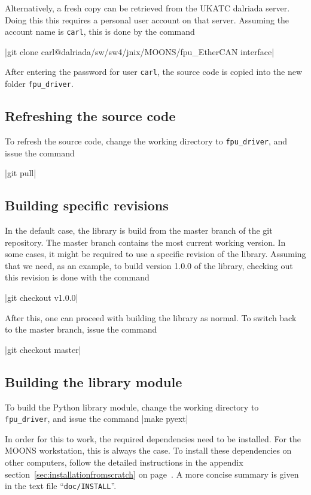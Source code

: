 \documentclass[11pt,a4paper]{report}
\begin{document}
Alternatively, a fresh copy can be retrieved from the UKATC dalriada
server. Doing this this requires a personal user account on that
server. Assuming the account name is \texttt{carl}, this is done by
the command

|git clone carl@dalriada/sw/sw4/jnix/MOONS/fpu_EtherCAN interface|

After entering the password for user \texttt{carl}, the
source code is copied into the new folder \texttt{fpu\_driver}.

\subsection{Refreshing the source code}
To refresh the source code, change the
working directory to \texttt{fpu\_driver},
and issue the command

|git pull|


\subsection{Building specific revisions}
In the default case, the library is build from
the master branch of the git repository.
The master branch contains the most current
working version.
In some cases, it might be required to
use a specific revision of the library.
Assuming that we need, as an example,
to build version 1.0.0 of the library,
checking out this revision is done with the
command

|git checkout v1.0.0|

After this, one can proceed with building the library as normal. To
switch back to the master branch, issue the command

|git checkout master|


\subsection{Building the library module}
To build the Python library module,
change the working directory to \texttt{fpu\_driver},
and issue the command |make pyext|

In order for this to work, the required dependencies need to be
installed. For the MOONS workstation, this is always the case. To
install these dependencies on other computers, follow the detailed
instructions in the appendix section~\ref{sec:installationfromscratch}
on page~\pageref{sec:installationfromscratch}.  A more concise summary
is given in the text file ``\texttt{doc/INSTALL}''.
\end{document}
